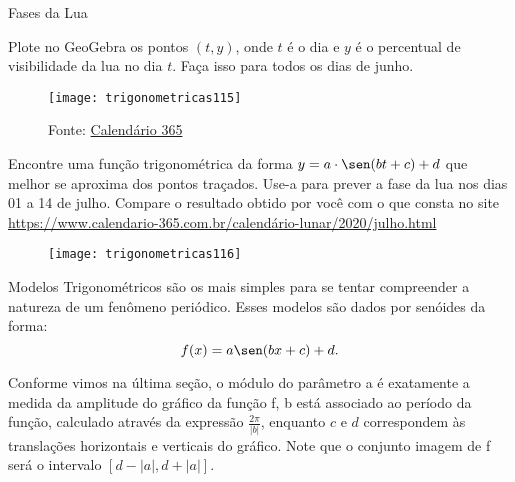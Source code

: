 \clearpage
\begin{task}{Fases da Lua}

Plote no GeoGebra os pontos $(t,y)$, onde $t$ é o dia e $y$ é o percentual de visibilidade da lua no dia $t$. Faça isso para todos os dias de junho.

\begin{figure}[H]
\centering

\texttt{[image: trigonometricas115]}
\caption{Fonte: \href{https://www.calendario-365.com.br/calend\%C3\%A1rio-lunar/2020/junho.html}{Calendário 365}}
\label{}
\end{figure}

Encontre uma função trigonométrica da forma $y = a\cdot\sen(bt+c) +d$ que melhor se aproxima dos pontos traçados. Use-a para prever a fase da lua nos dias 01 a 14 de julho. Compare o resultado obtido por você com o que consta no site \url{https://www.calendario-365.com.br/calendário-lunar/2020/julho.html}

\begin{figure}[H]
\centering

\texttt{[image: trigonometricas116]}
\end{figure}
\end{task}


Modelos Trigonométricos são os mais simples para se tentar compreender a natureza de um fenômeno periódico. Esses modelos são dados por senóides da forma:
\begin{equation*}
f(x)= a\sen(bx+c) + d.
\end{equation*}

Conforme vimos na última seção, o módulo do parâmetro a é exatamente a medida da amplitude do gráfico da função f, b está associado ao período da função, calculado através da expressão $\frac{2\pi}{|b|}$, enquanto $c$ e $d$ correspondem às translações horizontais e verticais do gráfico. Note que o conjunto imagem de f será o intervalo $[d -|a|, d+|a|]$.

